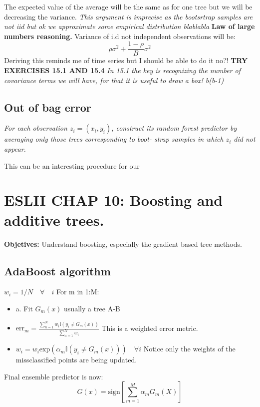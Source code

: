 \documentclass{article}
\begin{document}
The expected value of the average will be the same as for one tree but we will be decreasing the variance. \textit{This argument is imprecise as the bootsrtrap samples are not iid but ok we approximate some empirical distribution blablabla} \textbf{Law of large numbers reasoning.}
Variance of i.d not independent observations will be:
$$\rho \sigma^2 + \frac{1-\rho}{B}\sigma^2$$
Deriving this reminds me of time series but I should be able to do it no?!
\textbf{TRY EXERCISES 15.1 AND 15.4}
\textit{In 15.1 the key is recognizing the number of covariance terms we will have, for that it is useful to draw a box! b(b-1)}

\subsection{Out of bag error}
\textit{For each observation $z_i = (x_i, y_i)$, construct its random forest
predictor by averaging only those trees corresponding to boot-
strap samples in which $z_i$ did not appear.}

This can be an interesting procedure for our 

\section{ESLII CHAP 10: Boosting and additive trees.}

\textbf{Objetives:} Understand boosting, especially the gradient based tree methods.

\subsection{AdaBoost algorithm}
$w_i = 1/N \quad \forall \quad i$
For m in 1:M:
\begin{itemize}
    \item a. Fit $G_m(x)$ usually a tree A-B 
    \item $\text{err}_m = \frac{\sum_{n = 1}^{N} w_i \mathbb{I}(y_i \neq G_m(x))}{\sum_{n = 1}^{N} w_i}$ 
    This is a weighted error metric.
    \item $w_i = w_i \text{exp}(\alpha_m \mathbb{I}(y_i \neq G_m(x))) \quad \forall i$ Notice only the weights of the missclassified points are 
    being updated.

\end{itemize}
Final ensemble predictor is now: $$G(x) = \text{sign}[\sum_{m = 1}^{M} \alpha_m G_m (X)]$$        
\end{document}
